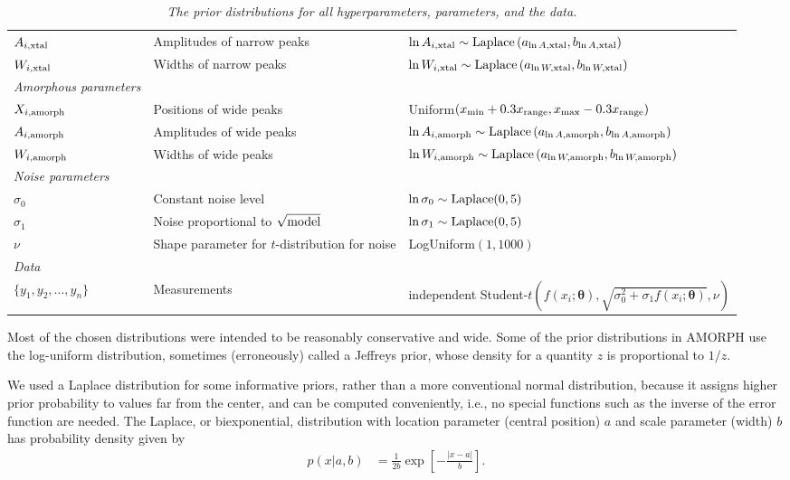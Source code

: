 \documentclass[preprint, a4paper]{elsarticle}
\newcommand{\params}{\boldsymbol{\theta}}
\begin{document}
\begin{landscape}
\begin{table}
\begin{tabular}{|lll|}
$A_{i, \rm xtal}$ & Amplitudes of narrow peaks &
 $\ln A_{i, \rm xtal} \sim \textnormal{Laplace}\left(a_{\ln A, \rm xtal}, b_{\ln A, \rm xtal}\right)$ \\
$W_{i, \rm xtal}$ & Widths of narrow peaks &
 $\ln W_{i, \rm xtal} \sim \textnormal{Laplace}\left(a_{\ln W, \rm xtal}, b_{\ln W, \rm xtal}\right)$ \\
\hline
{\em Amorphous parameters}&&\\
$X_{i, \rm amorph}$ & Positions of wide peaks &
          Uniform$(x_{\rm min}+0.3x_{\rm range}, x_{\rm max}-0.3x_{\rm range})$ \\
$A_{i, \rm amorph}$ & Amplitudes of wide peaks &
 $\ln A_{i, \rm amorph} \sim \textnormal{Laplace}\left(a_{\ln A, \rm amorph}, b_{\ln A, \rm amorph}\right)$ \\
$W_{i, \rm amorph}$ & Widths of wide peaks &
 $\ln W_{i, \rm amorph} \sim \textnormal{Laplace}\left(a_{\ln W, \rm amorph}, b_{\ln W, \rm amorph}\right)$ \\
\hline
{\em Noise parameters}&&\\
$\sigma_0$ &    Constant noise level  &   $\ln \sigma_0 \sim \textnormal{Laplace}(0,5)$\\
$\sigma_1$ &    Noise proportional to $\sqrt{\textnormal{model}}$   &  $\ln \sigma_1 \sim \textnormal{Laplace}(0,5)$ \\
$\nu$     &   Shape parameter for $t$-distribution for noise   &   LogUniform$(1, 1000)$\\
\hline
{\em Data}&&\\
\hline
$\{y_1, y_2, ..., y_n\}$  &   Measurements    & independent Student-$t(f(x_i; \params), \sqrt{\sigma_0^2 + \sigma_1f(x_i; \params)},\nu)$\\
\hline
\end{tabular}
\caption{\it The prior distributions for all hyperparameters,
parameters, and the data.\label{tab:priors}}
\end{table}

\end{landscape}

Most of the chosen distributions were intended to be reasonably
conservative and wide.
Some of the prior distributions in AMORPH use the log-uniform distribution,
sometimes (erroneously) called a Jeffreys prior, whose density for a quantity
$z$ is proportional to $1/z$.

We used a Laplace distribution for some informative priors, rather than
a more conventional normal distribution, because it assigns higher
prior probability to values far from the center, and can be computed conveniently, i.e., no special functions such as the inverse of the
error function are needed.
The Laplace, or biexponential, distribution with location parameter
(central position) $a$ and scale parameter (width) $b$ has probability
density given by
\begin{align}
p(x | a, b) &= \frac{1}{2b}\exp\left[-\frac{|x - a|}{b}\right].
\end{align}
\end{document}

